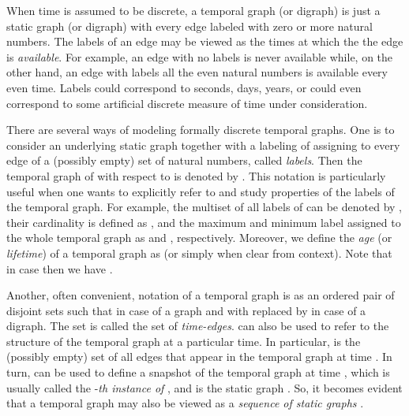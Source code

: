 \documentclass[oribibl, 11pt]{llncs}
\begin{document}
When time is assumed to be discrete, a temporal graph (or digraph) is just a static graph (or digraph)  with every edge  labeled with zero or more natural numbers. The labels of an edge may be viewed as the times at which the the edge is \emph{available}. For example, an edge with no labels is never available while, on the other hand, an edge with labels all the even natural numbers is available every even time. Labels could correspond to seconds, days, years, or could even correspond to some artificial discrete measure of time under consideration. 

There are several ways of modeling formally discrete temporal graphs. One is to consider an underlying static graph  together with a labeling  of  assigning to every edge of  a (possibly empty) set of natural numbers, called \emph{labels}. Then the temporal graph of  with respect to  is denoted by . This notation is particularly useful when one wants to explicitly refer to and study properties of the labels of the temporal graph. For example, the multiset of all labels of  can be denoted by , their cardinality is defined as , and the maximum and minimum label assigned to the whole temporal graph as  and , respectively. Moreover, we define the \emph{age} (or \emph{lifetime}) of a temporal graph  as  (or simply  when clear from context). Note that in case  then we have .

Another, often convenient, notation of a temporal graph  is as an ordered pair of disjoint sets  such that  in case of a graph and with  replaced by  in case of a digraph. The set  is called the set of \emph{time-edges}.  can also be used to refer to the structure of the temporal graph at a particular time. In particular,  is the (possibly empty) set of all edges that appear in the temporal graph at time . In turn,  can be used to define a snapshot of the temporal graph  at time , which is usually called the -\emph{th instance of }, and is the static graph . So, it becomes evident that a temporal graph may also be viewed as a \emph{sequence of static graphs} .
\end{document}
